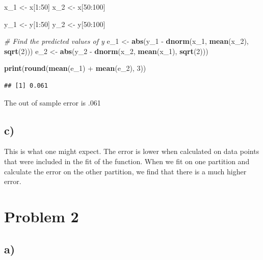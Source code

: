 \documentclass[]{article}
\newenvironment{Shaded}{\begin{snugshade}}{\end{snugshade}}
\newcommand{\KeywordTok}[1]{\textcolor[rgb]{0.13,0.29,0.53}{\textbf{{#1}}}}
\newcommand{\DecValTok}[1]{\textcolor[rgb]{0.00,0.00,0.81}{{#1}}}
\newcommand{\StringTok}[1]{\textcolor[rgb]{0.31,0.60,0.02}{{#1}}}
\newcommand{\CommentTok}[1]{\textcolor[rgb]{0.56,0.35,0.01}{\textit{{#1}}}}
\newcommand{\NormalTok}[1]{{#1}}
\begin{document}
\begin{Shaded}
\begin{Highlighting}[]
\NormalTok{x_1 <-}\StringTok{ }\NormalTok{x[}\DecValTok{1}\NormalTok{:}\DecValTok{50}\NormalTok{]}
\NormalTok{x_2 <-}\StringTok{ }\NormalTok{x[}\DecValTok{50}\NormalTok{:}\DecValTok{100}\NormalTok{]}

\NormalTok{y_1 <-}\StringTok{ }\NormalTok{y[}\DecValTok{1}\NormalTok{:}\DecValTok{50}\NormalTok{]}
\NormalTok{y_2 <-}\StringTok{ }\NormalTok{y[}\DecValTok{50}\NormalTok{:}\DecValTok{100}\NormalTok{]}

\CommentTok{# Find the predicted values of y }
\NormalTok{e_1 <-}\StringTok{ }\KeywordTok{abs}\NormalTok{(y_1 -}\StringTok{ }\KeywordTok{dnorm}\NormalTok{(x_1, }\KeywordTok{mean}\NormalTok{(x_2), }\KeywordTok{sqrt}\NormalTok{(}\DecValTok{2}\NormalTok{)))}
\NormalTok{e_2 <-}\StringTok{ }\KeywordTok{abs}\NormalTok{(y_2 -}\StringTok{ }\KeywordTok{dnorm}\NormalTok{(x_2, }\KeywordTok{mean}\NormalTok{(x_1), }\KeywordTok{sqrt}\NormalTok{(}\DecValTok{2}\NormalTok{)))}

\KeywordTok{print}\NormalTok{(}\KeywordTok{round}\NormalTok{(}\KeywordTok{mean}\NormalTok{(e_1) +}\StringTok{ }\KeywordTok{mean}\NormalTok{(e_2), }\DecValTok{3}\NormalTok{))}
\end{Highlighting}
\end{Shaded}

\begin{verbatim}
## [1] 0.061
\end{verbatim}

The out of sample error is .061

\subsection{c)}\label{c}

This is what one might expect. The error is lower when calculated on
data points that were included in the fit of the function. When we fit
on one partition and calculate the error on the other partition, we find
that there is a much higher error.

\section{Problem 2}\label{problem-2}

\subsection{a)}\label{a-1}
\end{document}
